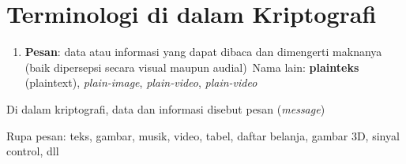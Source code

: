 \documentclass{article}
\begin{document}

\section*{Terminologi di dalam Kriptografi}

\begin{enumerate}
    \item \textbf{Pesan}: data atau informasi yang dapat dibaca dan dimengerti maknanya (baik dipersepsi secara visual maupun audial)\
    Nama lain: \textbf{plainteks} (plaintext), \textit{plain-image}, \textit{plain-video}, \textit{plain-video}
\end{enumerate}

Di dalam kriptografi, data dan informasi disebut pesan (\textit{message})

Rupa pesan: teks, gambar, musik, video, tabel, daftar belanja, gambar 3D, sinyal control, dll
\end{document}
